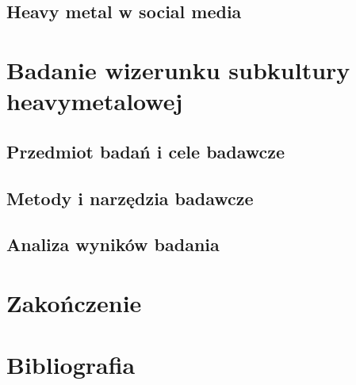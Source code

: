\documentclass[12pt, a4paper, titlepage]{report}
\begin{document}
\section{Heavy metal w social media}
\chapter{Badanie wizerunku subkultury heavymetalowej}
\section{Przedmiot badań i cele badawcze}
\section{Metody i narzędzia badawcze}
\section{Analiza wyników badania}
\chapter*{Zakończenie}
\chapter*{Bibliografia}
\end{document}
